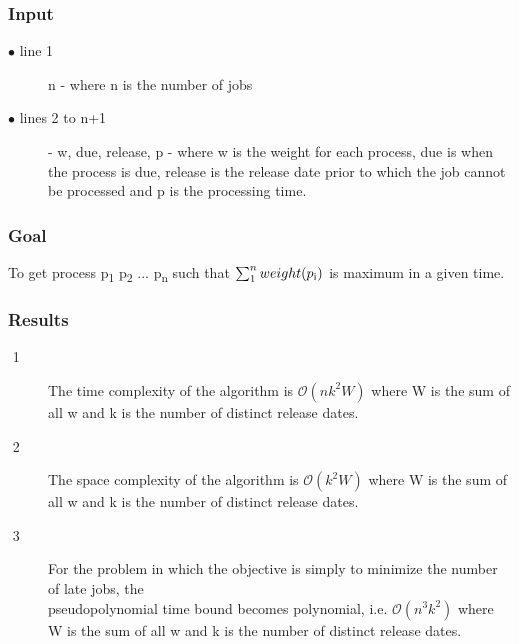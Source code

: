 \documentclass[11pt]{article}
\begin{document}
{			\subsubsection{Input}
			\begin{description}
				\item[$\bullet$ line 1]  n - where n is the number of jobs
				\item[$\bullet$ lines 2 to n+1] - w, due, release, p - where w is the weight for each process, due is when the process is due, release is the release date prior to which the job cannot be processed and p is the processing time.
			\end{description}
			
			\subsubsection{Goal}
			To get process p\textsubscript{1} p\textsubscript{2} ... p\textsubscript{n} such that $\sum_{1}^{n} weight (p\textsubscript{i})$ is maximum in a given time.
			
			\subsubsection{Results}
			\begin{description}
				\item[$$ 1] The time complexity of the algorithm is $\mathcal{O}(nk^2W)$ where W is the sum of all w and k is the number of distinct release dates. \citet{Lawler1990}
				\item[$$ 2] The space complexity of the algorithm is $\mathcal{O}(k^2W)$ where W is the sum of all w and k is the number of distinct release dates. \citet{Lawler1990}
				\item[$$ 3] For the problem in which the objective is simply to minimize the number of late jobs, the \\pseudopolynomial time bound becomes polynomial, i.e. $\mathcal{O}(n^3k^2)$ where W is the sum of all w and k is the number of distinct release dates. \citet{Lawler1990}
				\end{description}
				
}
\end{document}
